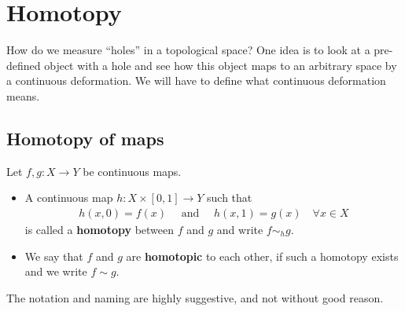 \section{Homotopy}
How do we measure ``holes'' in a topological space?
One idea is to look at a pre-defined object with a hole and see how this object maps to an arbitrary space by a continuous deformation.
We will have to define what continuous deformation means.
\subsection{Homotopy of maps}
\begin{dfn}[]
Let $f,g: X \to Y$ be continuous maps.
\begin{itemize}
  \item A continuous map $h: X \times [0,1] \to  Y$ such that
    \begin{align*}
      h(x,0) = f(x) \quad \text{ and } \quad h(x,1) = g(x) \quad\forall x \in X
    \end{align*}
    is called a \textbf{homotopy} between $f$ and $g$ and write $f \sim_h g$.
  \item We say that $f$ and $g$ are \textbf{homotopic} to each other, if such a homotopy exists and we write $f \sim g$.
\end{itemize}
\end{dfn}
The notation and naming are highly suggestive, and not without good reason.
